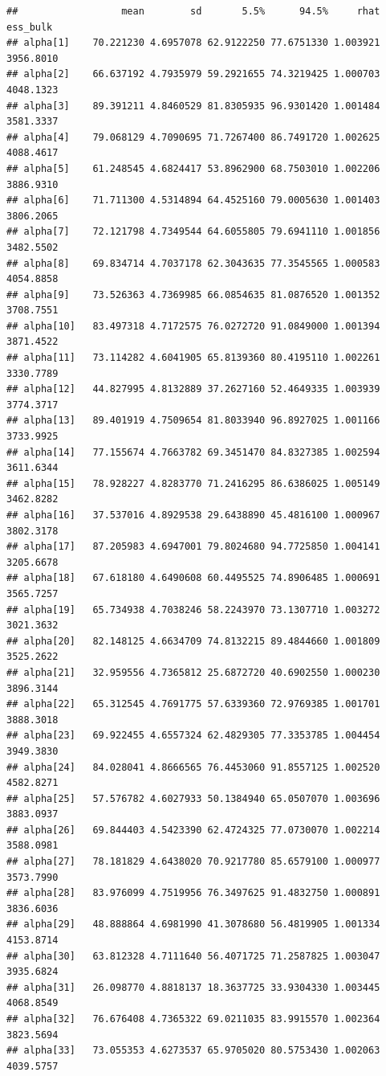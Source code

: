 \documentclass[
]{book}
\begin{document}
\begin{verbatim}
##                  mean        sd       5.5%      94.5%     rhat  ess_bulk
## alpha[1]    70.221230 4.6957078 62.9122250 77.6751330 1.003921 3956.8010
## alpha[2]    66.637192 4.7935979 59.2921655 74.3219425 1.000703 4048.1323
## alpha[3]    89.391211 4.8460529 81.8305935 96.9301420 1.001484 3581.3337
## alpha[4]    79.068129 4.7090695 71.7267400 86.7491720 1.002625 4088.4617
## alpha[5]    61.248545 4.6824417 53.8962900 68.7503010 1.002206 3886.9310
## alpha[6]    71.711300 4.5314894 64.4525160 79.0005630 1.001403 3806.2065
## alpha[7]    72.121798 4.7349544 64.6055805 79.6941110 1.001856 3482.5502
## alpha[8]    69.834714 4.7037178 62.3043635 77.3545565 1.000583 4054.8858
## alpha[9]    73.526363 4.7369985 66.0854635 81.0876520 1.001352 3708.7551
## alpha[10]   83.497318 4.7172575 76.0272720 91.0849000 1.001394 3871.4522
## alpha[11]   73.114282 4.6041905 65.8139360 80.4195110 1.002261 3330.7789
## alpha[12]   44.827995 4.8132889 37.2627160 52.4649335 1.003939 3774.3717
## alpha[13]   89.401919 4.7509654 81.8033940 96.8927025 1.001166 3733.9925
## alpha[14]   77.155674 4.7663782 69.3451470 84.8327385 1.002594 3611.6344
## alpha[15]   78.928227 4.8283770 71.2416295 86.6386025 1.005149 3462.8282
## alpha[16]   37.537016 4.8929538 29.6438890 45.4816100 1.000967 3802.3178
## alpha[17]   87.205983 4.6947001 79.8024680 94.7725850 1.004141 3205.6678
## alpha[18]   67.618180 4.6490608 60.4495525 74.8906485 1.000691 3565.7257
## alpha[19]   65.734938 4.7038246 58.2243970 73.1307710 1.003272 3021.3632
## alpha[20]   82.148125 4.6634709 74.8132215 89.4844660 1.001809 3525.2622
## alpha[21]   32.959556 4.7365812 25.6872720 40.6902550 1.000230 3896.3144
## alpha[22]   65.312545 4.7691775 57.6339360 72.9769385 1.001701 3888.3018
## alpha[23]   69.922455 4.6557324 62.4829305 77.3353785 1.004454 3949.3830
## alpha[24]   84.028041 4.8666565 76.4453060 91.8557125 1.002520 4582.8271
## alpha[25]   57.576782 4.6027933 50.1384940 65.0507070 1.003696 3883.0937
## alpha[26]   69.844403 4.5423390 62.4724325 77.0730070 1.002214 3588.0981
## alpha[27]   78.181829 4.6438020 70.9217780 85.6579100 1.000977 3573.7990
## alpha[28]   83.976099 4.7519956 76.3497625 91.4832750 1.000891 3836.6036
## alpha[29]   48.888864 4.6981990 41.3078680 56.4819905 1.001334 4153.8714
## alpha[30]   63.812328 4.7111640 56.4071725 71.2587825 1.003047 3935.6824
## alpha[31]   26.098770 4.8818137 18.3637725 33.9304330 1.003445 4068.8549
## alpha[32]   76.676408 4.7365322 69.0211035 83.9915570 1.002364 3823.5694
## alpha[33]   73.055353 4.6273537 65.9705020 80.5753430 1.002063 4039.5757

\end{verbatim}
\end{document}
